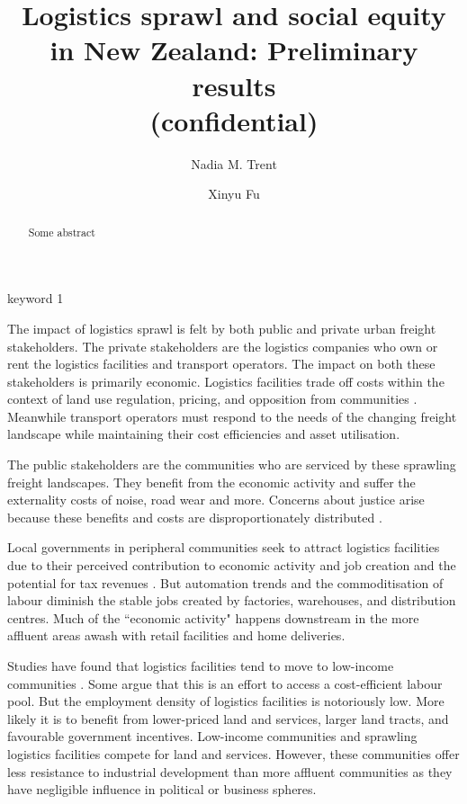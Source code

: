 \documentclass[3p, a4paper, authoryear, 11pt, fleqn, review]{elsarticle}
\title{Logistics sprawl and social equity in New Zealand: Preliminary results\\
 (confidential)}
\author[UW]{Nadia M. Trent\fnref{ead1}}
\author[UW]{Xinyu Fu\fnref{ead2}}
\begin{document}



\begin{abstract}\small
Some abstract
\end{abstract}

\begin{keyword}
keyword 1
\end{keyword}


\maketitle

The impact of logistics sprawl is felt by both public and private urban freight stakeholders. The private stakeholders are the logistics companies who own or rent the logistics facilities and transport operators. The impact on both these stakeholders is primarily economic. Logistics facilities trade off costs within the context of land use regulation, pricing, and opposition from communities \citep{Lindsey_etal2014}. Meanwhile transport operators must respond to the needs of the changing freight landscape while maintaining their cost efficiencies and asset utilisation. 

The public stakeholders are the communities who are serviced by these sprawling freight landscapes. They benefit from the economic activity and suffer the externality costs of noise, road wear and more. Concerns about justice arise because these benefits and costs are disproportionately distributed \citep{Cidell2015, Yuan2018}.

Local governments in peripheral communities seek to attract logistics facilities due to their perceived contribution to economic activity and job creation and the potential for tax revenues \citep{Strale2020}. But automation trends and the commoditisation of labour \citep{Cidell2015} diminish the stable jobs created by factories, warehouses, and distribution centres. Much of the ``economic activity" happens downstream in the more affluent areas awash with retail facilities and home deliveries. 

Studies have found that logistics facilities tend to move to low-income communities \citep{Jaller_etal2017, Strale2020}. Some argue that this is an effort to access a cost-efficient labour pool. But the employment density of logistics facilities is notoriously low. More likely it is to benefit from lower-priced land and services, larger land tracts, and favourable government incentives. Low-income communities and sprawling logistics facilities compete for land and services. However, these communities offer less resistance to industrial development than more affluent communities as they have negligible influence in political or business spheres. 
\end{document}
